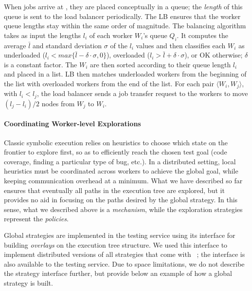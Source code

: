 When jobs arrive at \wdst, they are placed conceptually in a queue; the \emph{length} of this queue is sent to the load balancer periodically.  The LB ensures that the worker queue lengths stay within the same order of magnitude.  The balancing algorithm takes as input the lengths $l_i$ of each worker $W_i$'s queue $Q_i$.  It computes the average $\bar{l}$ and standard deviation $\sigma$ of the $l_i$ values and then classifies each $W_i$ as underloaded ($l_i < max \{ \bar{l}-\delta \cdot \sigma, 0 \}$), overloaded ($l_i > \bar{l} + \delta \cdot \sigma$), or OK otherwise; $\delta$ is a constant factor.  The $W_i$ are then sorted according to their queue length $l_i$ and placed in a list.  LB then matches underloaded workers from the beginning of the list with overloaded workers from the end of the list.  For each pair $\langle W_i,W_j \rangle$, with $l_i < l_j$, the load balancer sends a job transfer request to the workers to  move $(l_j - l_i)/2$ \candidate nodes from $W_j$ to $W_i$.


\paragraph{Coordinating Worker-level Explorations}
\label{sec:globalStrategy}

Classic symbolic execution relies on heuristics to choose which state on the frontier to explore first, so as to efficiently reach the chosen test goal (code coverage, finding a particular type of bug, etc.). In a distributed setting, local heuristics must be coordinated across workers to achieve the global goal, while keeping communication overhead at a minimum. What we have described so far ensures that eventually all paths in the execution tree are explored, but it provides no aid in focusing on the paths desired by the global strategy.  In this sense, what we described above is a \emph{mechanism}, while the exploration strategies represent the \emph{policies}.

Global strategies are implemented in the testing service using its interface for building {\em overlays} on the execution tree structure.  We used this interface to implement distributed versions of all strategies that come with \klee~\cite{klee}; the interface is also available to the testing service.  Due to space limitations, we do not describe the strategy interface further, but provide below an example of how a global strategy is built.

